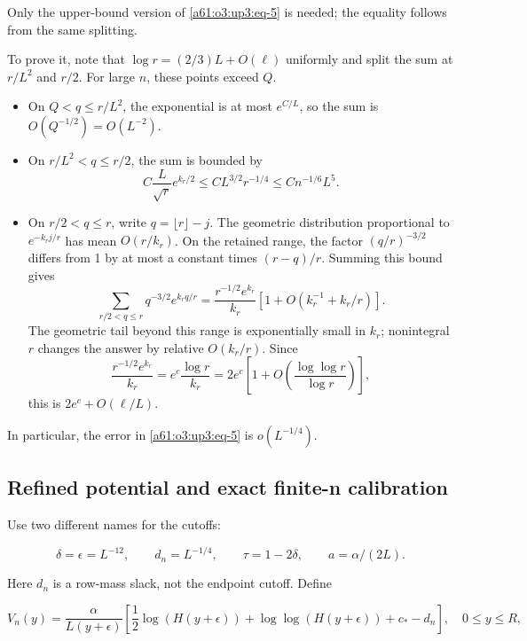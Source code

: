 \documentclass[11pt,letterpaper]{article}
\numberwithin{equation}{section}
\theoremstyle{remark}\newtheorem{remark}[theorem]{Remark}
\begin{document}
Only the upper-bound version of \eqref{a61:o3:up3:eq-5} is needed; the equality
follows from the same splitting.

To prove it, note that \(\log r=(2/3)L+O(\ell)\) uniformly and split the
sum at \(r/L^2\) and \(r/2\). For large \(n\), these points exceed
\(Q\).

\begin{itemize}
\item
  On \(Q<q\le r/L^2\), the exponential is at most \(e^{C/L}\), so the
  sum is \(O(Q^{-1/2})=O(L^{-2})\).
\item
  On \(r/L^2<q\le r/2\), the sum is bounded by \[
  C\frac{L}{\sqrt r}e^{k_r/2}
  \le C L^{3/2}r^{-1/4}
  \le C n^{-1/6}L^5.
  \]
\item
  On \(r/2<q\le r\), write \(q=\lfloor r\rfloor-j\). The geometric
  distribution proportional to \(e^{-k_rj/r}\) has mean \(O(r/k_r)\). On
  the retained range, the factor \((q/r)^{-3/2}\) differs from 1 by at
  most a constant times \((r-q)/r\). Summing this bound gives
  \begin{equation}
  \sum_{r/2<q\le r}q^{-3/2}e^{k_rq/r}
  =\frac{r^{-1/2}e^{k_r}}{k_r}
    \left[1+O(k_r^{-1}+k_r/r)\right].
  \label{a61:o3:up3:eq-6}
  \end{equation} The geometric tail beyond this range is exponentially
  small in \(k_r\); nonintegral \(r\) changes the answer by relative
  \(O(k_r/r)\). Since \[
  \frac{r^{-1/2}e^{k_r}}{k_r}=e^c\frac{\log r}{k_r}
  =2e^c\left[1+O\!\left(\frac{\log\log r}{\log r}\right)\right],
  \] this is \(2e^c+O(\ell/L)\).
\end{itemize}

In particular, the error in \eqref{a61:o3:up3:eq-5} is \(o(L^{-1/4})\).

\subsection{Refined potential and exact finite-n calibration}

Use two different names for the cutoffs:

\[
\delta=\epsilon=L^{-12},\qquad d_n=L^{-1/4},\qquad
\tau=1-2\delta,\qquad a=\alpha/(2L).
\]

Here \(d_n\) is a row-mass slack, not the endpoint cutoff. Define

\begin{equation}
V_n(y)=\frac{\alpha}{L(y+\epsilon)}
 \left[\frac12\log(H(y+\epsilon))
       +\log\log(H(y+\epsilon))+c_*-d_n\right],\quad 0\le y\le R,
\label{a61:o3:up3:eq-7}
\end{equation}
\end{document}
